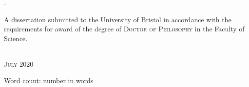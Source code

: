\begin{titlingpage}
\begin{SingleSpace}
\begin{adjustwidth*}{\unitlength}{-\unitlength}
\begin{center}
\begin{minipage}{10cm}
A dissertation submitted to the University of Bristol in accordance with the requirements for award of the degree of \textsc{Doctor of Philosophy} in the Faculty of Science.
\end{minipage}\\
\vspace{9mm}
{\large\textsc{July 2020}}  %
\vspace{12mm}
\end{center}
\begin{flushright}
{\small Word count: number in words}  %
\end{flushright}
\end{adjustwidth*}
\end{SingleSpace}
\end{titlingpage}
